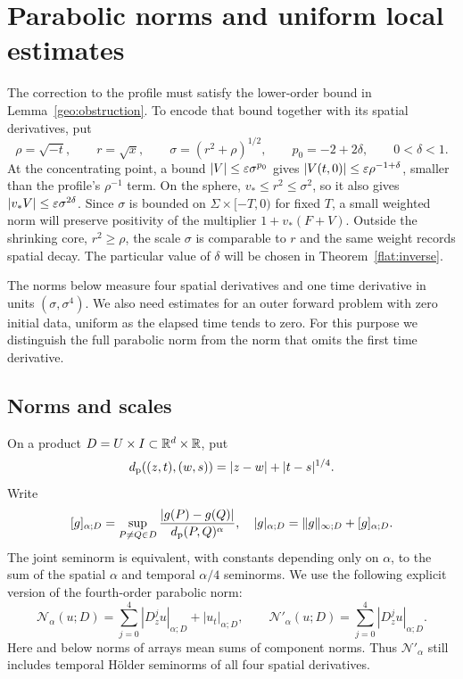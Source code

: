 \section{Parabolic norms and uniform local estimates}\label{sec:parabolic}\label{ana:section}

The correction to the profile must satisfy the lower-order bound in
Lemma~\ref{geo:obstruction}.  To encode that bound together with its
spatial derivatives, put
\[
 \rho=\sqrt{-t},\qquad r=\sqrt{x},\qquad
 \sigma=(r^2+\rho)^{1/2},\qquad p_0=-2+2\delta,
 \qquad 0<\delta<1.
\]
At the concentrating point, a bound $|V|\le\varepsilon\sigma^{p_0}$ gives
$|V(t,0)|\le\varepsilon\rho^{-1+\delta}$, smaller than the profile's
$\rho^{-1}$ term.  On the sphere, $v_*\le r^2\le\sigma^2$, so it
also gives $|v_*V|\le\varepsilon\sigma^{2\delta}$.  Since $\sigma$ is
bounded on $\Sigma\times[-T,0)$ for fixed $T$, a small weighted norm
will preserve positivity of the multiplier $1+v_*(F+V)$.
Outside the shrinking core, $r^2\ge\rho$,
the scale $\sigma$ is comparable to $r$ and the same weight records
spatial decay.  The particular value of $\delta$ will be chosen in
Theorem~\ref{flat:inverse}.

The norms below measure four spatial derivatives and one time derivative
in units $(\sigma,\sigma^4)$.  We also need estimates for an outer
forward problem with zero initial data, uniform as the elapsed time
tends to zero.  For this purpose we distinguish the full parabolic norm
from the norm that omits the first time derivative.

\subsection{Norms and scales}

On a product $D=U\times I\subset\mathbb{R}^d\times\mathbb{R}$, put
\[
 d_{\rm p}((z,t),(w,s))=|z-w|+|t-s|^{1/4}.
\]
Write
\[
 [g]_{\alpha;D}=\sup_{P\ne Q\in D}
       \frac{|g(P)-g(Q)|}{d_{\rm p}(P,Q)^\alpha},
 \quad |g|_{\alpha;D}=\|g\|_{\infty;D}+[g]_{\alpha;D}.
\]
The joint seminorm is equivalent, with constants depending only on
$\alpha$, to the sum of the spatial $\alpha$ and temporal $\alpha/4$
seminorms.  We use the following explicit version of the fourth-order
parabolic norm:
\begin{equation}\label{ana:local-norm}
 \mathcal N_\alpha(u;D)
   =\sum_{j=0}^4|D_z^ju|_{\alpha;D}+|u_t|_{\alpha;D},\qquad
 \mathcal N'_\alpha(u;D)=\sum_{j=0}^4|D_z^ju|_{\alpha;D}.
\end{equation}
Here and below norms of arrays mean sums of component norms.  Thus
$\mathcal N'_\alpha$ still includes temporal H\"older seminorms of all
four spatial derivatives.

